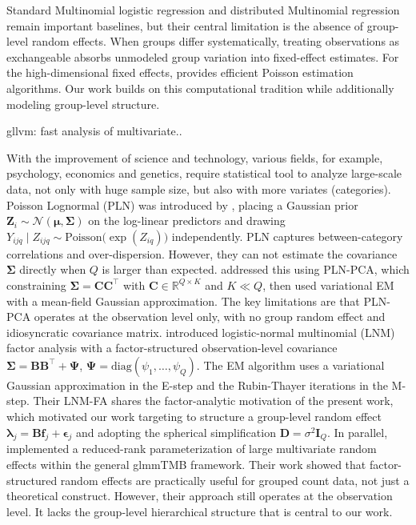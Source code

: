 Standard Multinomial logistic regression and distributed Multinomial regression remain important baselines, but their central limitation is the absence of group-level random effects. When groups differ systematically, treating observations as exchangeable absorbs unmodeled group variation into fixed-effect estimates. For the high-dimensional fixed effects, \citet{Correia2020} provides efficient Poisson estimation algorithms. Our work builds on this computational tradition while additionally modeling group-level structure.

gllvm: fast analysis of multivariate.. 
 
With the improvement of science and technology, various fields, for example, psychology, economics and genetics, require statistical tool to analyze large-scale data, not only with huge sample size, but also with more variates (categories). Poisson Lognormal (PLN) was introduced by \citet{Aitchison1989}, placing a Gaussian prior $\bm{Z}_i \sim \mathcal{N}(\bm{\mu}, \bm{\Sigma})$ on the log-linear predictors and drawing $Y_{ijq} \mid Z_{ijq} \sim \mathrm{Poisson}\bigl(\exp(Z_{iq})\bigr)$ independently. PLN captures between-category correlations and over-dispersion. However, they can not estimate the covariance $\bm{\Sigma}$ directly when $Q$ is larger than expected. \citet{Chiquet2018} addressed this using PLN-PCA, which constraining $\bm{\Sigma} = \mathbf{CC}^\top$ with $\mathbf{C}\in\mathbb{R}^{Q\times K}$ and $K\ll Q$, then used variational EM with a mean-field Gaussian approximation. The key limitations are that PLN-PCA operates at the observation level only, with no group random effect and idiosyncratic covariance matrix. \citet{Tu2023} introduced logistic-normal multinomial (LNM) factor analysis with a factor-structured observation-level covariance $\bm{\Sigma} = \mathbf{BB}^{\top} + \bm{\Psi}$, $\bm{\Psi} = \mathrm{diag}(\psi_1,\ldots,\psi_Q)$. The EM algorithm uses a variational Gaussian approximation in the E-step and the Rubin-Thayer iterations \citep{Rubin1982} in the M-step. Their LNM-FA shares the factor-analytic motivation of the present work, which motivated our work targeting to structure a group-level random effect $\bm{\lambda}_j = \mathbf{B}\mathbf{f}_j + \bm{\epsilon}_j$ and adopting the spherical simplification $\mathbf{D} = \sigma^2\mathbf{I}_Q$. In parallel, \citet{mcgillycuddy2024} implemented a reduced-rank parameterization of large multivariate random effects within the general glmmTMB framework. Their work showed that factor-structured random effects are practically useful for grouped count data, not just a theoretical construct. However, their approach still operates at the observation level. It lacks the group-level hierarchical structure that is central to our work.

